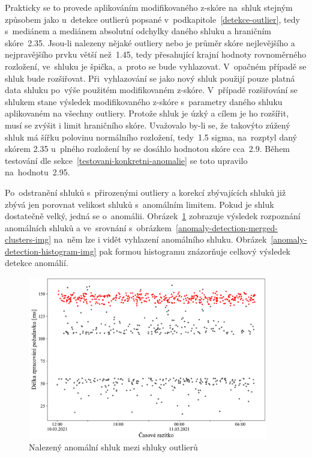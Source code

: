 Prakticky se to provede aplikováním modifikovaného z-skóre na~shluk stejným způsobem jako u~detekce outlierů popsané v~podkapitole~\ref{detekce-outlier}, tedy s~mediánem a mediánem absolutní odchylky daného shluku a hraničním skóre~2.35. Jsou-li nalezeny nějaké outliery nebo je průměr skóre nejlevějšího a nejpravějšího prvku větší než~1.45, tedy přesahující krajní hodnoty rovnoměrného rozložení, ve~shluku je špička, a~proto se bude vyhlazovat. V~opačném případě se shluk bude rozšiřovat. Při~vyhlazování se jako nový shluk použijí pouze platná data shluku po~výše použitém modifikovaném z-skóre. V~případě rozšiřování se shlukem stane výsledek modifikovaného z-skóre s~parametry daného shluku aplikovaném na všechny outliery. Protože shluk je úzký a cílem je ho rozšířit, musí se zvýšit i limit hraničního skóre.
Uvažovalo by-li se, že takovýto zúžený shluk má šířku polovinu normálního rozložení, tedy~1.5 sigma, na~rozptyl daný skórem 2.35 u~plného rozložení by se dosáhlo hodnotou skóre cca~2.9. Během testování dle sekce~\ref{testovani-konkretni-anomalie} se toto upravilo na~hodnotu~2.95.

Po~odstranění shluků s~přirozenými outliery a korekcí zbývajících shluků již zbývá jen porovnat velikost shluků s~anomálním limitem. Pokud je shluk dostatečně velký, jedná se o~anomálii. Obrázek~\ref{anomaly-detection-anomalous-cluster-img} zobrazuje výsledek rozpoznání anomálních shluků a ve~srovnání s~obrázkem~\ref{anomaly-detection-merged-clusters-img} na~něm lze i vidět vyhlazení anomálního shluku. Obrázek~\ref{anomaly-detection-histogram-img} pak formou histogramu znázorňuje celkový výsledek detekce anomálií.

\begin{figure}[hbt]
    \centering
    \includegraphics[width=0.935\textwidth]{obrazky/anomaly-detection-anomalous-cluster.pdf}
    \caption{Nalezený anomální shluk mezi shluky outlierů}
    \label{anomaly-detection-anomalous-cluster-img}
\end{figure}

